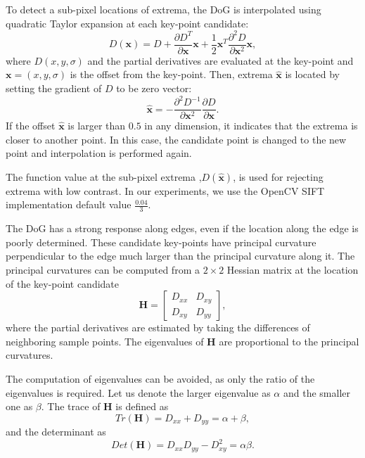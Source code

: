 To detect a sub-pixel locations of extrema, the DoG is interpolated using quadratic Taylor expansion at each key-point candidate:
\begin{equation}
    D(\boldsymbol{x}) = D + \frac{\partial D^T}{\partial \boldsymbol{x}}\boldsymbol{x}+\frac{1}{2}\boldsymbol{x}^T\frac{\partial^2 D}{\partial \boldsymbol{x}^2}\boldsymbol{x},
    \label{eq:taylor_expansion}
\end{equation}
where \( D(x,y,\sigma) \) and the partial derivatives are evaluated at the key-point and \( \boldsymbol{x}=(x,y,\sigma) \) is the offset from the key-point. Then, extrema \( \hat{\boldsymbol{x}} \) is located by setting the gradient of \( D \) to be zero vector:
\begin{equation}
    \hat{\boldsymbol{x}} = - \frac{\partial^2 D^{-1}}{\partial \boldsymbol{x}^2}\frac{\partial D}{\partial \boldsymbol{x}}.
    \label{eq:taylor_extremum}
\end{equation}
If the offset \( \hat{\boldsymbol{x}} \) is larger than \( 0.5 \) in any dimension, it indicates that the extrema is closer to another point. In this case, the candidate point is changed to the new point and interpolation is performed again.

The function value at the sub-pixel extrema ,$D(\hat{\boldsymbol{x}})$, is used for rejecting extrema with low contrast. In our experiments, we use the OpenCV SIFT implementation default value $\frac{0.04}{3}$\cite{openCV}.

The DoG has a strong response along edges, even if the location along the edge is poorly determined. These candidate key-points have principal curvature perpendicular to the edge much larger than the principal curvature along it. The principal curvatures can be computed from a $2\times2$ Hessian matrix at the location of the key-point candidate
\begin{equation}
    \boldsymbol{H} =
    \begin{bmatrix}
        D_{xx} & D_{xy}\\
        D_{xy} & D_{yy}
    \end{bmatrix},
    \label{eq:hessian}
\end{equation}
where the partial derivatives are estimated by taking the differences of neighboring sample points. The eigenvalues of $\boldsymbol{H}$ are proportional to the principal curvatures.

The computation of eigenvalues can be avoided, as only the ratio of the eigenvalues is required. Let us denote the larger eigenvalue as $\alpha$ and the smaller one as $\beta$. The trace of $\boldsymbol{H}$ is defined as
\begin{equation}
    Tr(\boldsymbol{H}) = D_{xx}+D_{yy} = \alpha+\beta,
\end{equation}
and the determinant as
\begin{equation}
    Det(\boldsymbol{H}) = D_{xx}D_{yy}-D_{xy}^2 = \alpha\beta.
\end{equation}

